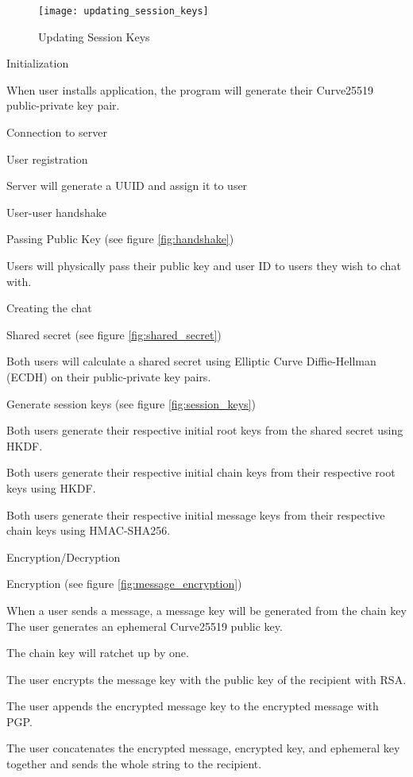 \documentclass[12pt]{article}
\begin{document}
\begin{figure}[h]
\caption{Updating Session Keys}
\label{fig:updating_session_keys}
\centering
\texttt{[image: updating\_session\_keys]}
\end{figure}
\begin{outline}[enumerate]
\1 Initialization

	\2 When user installs application, the program will generate their
	Curve25519 public-private key pair.

\1 Connection to server

	\2 User registration

		\3 Server will generate a UUID and assign it to user

\1 User-user handshake

		\2 Passing Public Key (see figure \ref{fig:handshake})

		\3 Users will physically pass their public key and user ID to users
		they wish to chat with.

\1 Creating the chat

		\2 Shared secret (see figure \ref{fig:shared_secret})

		\3 Both users will calculate a shared secret using Elliptic Curve
		Diffie-Hellman (ECDH) on their public-private key pairs.

	\2 Generate session keys (see figure \ref{fig:session_keys})


		\3 Both users generate their respective initial root keys from the
		shared secret using HKDF.

		\3 Both users generate their respective initial chain keys from their
		respective root keys using HKDF.

		\3 Both users generate their respective initial message keys from their
		respective chain keys using HMAC-SHA256.

\1 Encryption/Decryption

	\2 Encryption (see figure \ref{fig:message_encryption})


		\3 When a user sends a message, a message key will be generated from
		the chain key The user generates an ephemeral Curve25519 public key.

		\3 The chain key will ratchet up by one.

		\3 The user encrypts the message key with the public key of the
		recipient with RSA.

		\3 The user appends the encrypted message key to the encrypted message
		with PGP.

		\3 The user concatenates the encrypted message, encrypted key, and
		ephemeral key together and sends the whole string to the recipient.


\end{outline}
\end{document}
